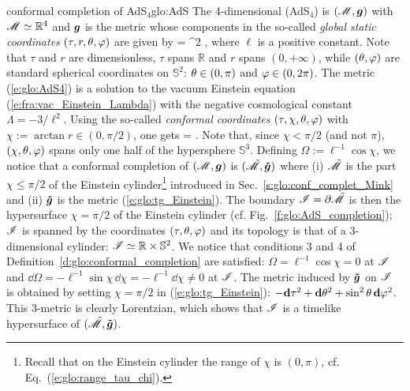 \begin{texample}{conformal completion of AdS$_{4}$}{glo:AdS}
The 4-dimensional  (AdS$_{4}$)
is $(\mathscr{M},\bm{g})$ with $\mathscr{M}\simeq \mathbb{R}^4$ and $\bm{g}$ is the metric
whose components in the so-called \emph{global static coordinates}
$(\tau,r,\theta,\varphi)$ are given by
\be \label{e:glo:AdS4}
     = \ell^2  ,
\ee
where $\ell$ is a positive constant.
Note that $\tau$ and $r$ are dimensionless, $\tau$ spans $\mathbb{R}$ and $r$ spans $(0,+\infty)$,
while $(\theta,\varphi)$ are standard spherical coordinates on $\mathbb{S}^2$:
$\theta\in(0,\pi)$ and $\varphi\in(0,2\pi)$.
The metric (\ref{e:glo:AdS4}) is a solution to
the vacuum Einstein equation (\ref{e:fra:vac_Einstein_Lambda}) with
the negative cosmological constant $\Lambda = - 3/\ell^2$.
Using the so-called \emph{conformal coordinates} $(\tau,\chi,\theta,\varphi)$ with
$\chi := \arctan r \in (0,\pi/2)$, one gets
\be \label{e:glo:metrix_AdS_conformal}
    =   .
\ee
Note that, since $\chi < \pi/2$ (and not $\pi$), $(\chi,\theta,\varphi)$ spans only one half of the hypersphere $\mathbb{S}^3$.
Defining $\Omega := \ell^{-1}\cos\chi$, we notice that
a conformal completion of $(\mathscr{M},\bm{g})$ is $(\tilde{\mathscr{M}},\bm{\tilde{g}})$
where (i) $\tilde{\mathscr{M}}$ is the part $\chi \leq \pi/2$ of the Einstein cylinder\footnote{Recall that on the
Einstein cylinder the range of $\chi$ is $(0,\pi)$, cf. Eq.~(\ref{e:glo:range_tau_chi}).}
introduced in Sec.~\ref{s:glo:conf_complet_Mink}
and (ii)  $\bm{\tilde{g}}$ is the metric (\ref{e:glo:tg_Einstein}).
The boundary $\mathscr{I} = \partial\tilde{\mathscr{M}}$ is then the hypersurface $\chi=\pi/2$
of the Einstein cylinder (cf. Fig.~\ref{f:glo:AdS_completion});
$\mathscr{I}$ is spanned by the coordinates $(\tau,\theta,\varphi)$
and its topology is that of a 3-dimensional cylinder: $\mathscr{I} \simeq \mathbb{R}\times\mathbb{S}^2$.
We notice that conditions 3 and 4 of Definition~\ref{d:glo:conformal_completion}
are satisfied: $\Omega = \ell^{-1} \cos\chi = 0$ at $\mathscr{I}$ and
$\dd\Omega = - \ell^{-1} \sin\chi\, \dd\chi = -\ell^{-1} \dd\chi \not = 0 $
at $\mathscr{I}$.
The metric induced by $\bm{\tilde{g}}$ on $\mathscr{I}$ is obtained by
setting $\chi=\pi/2$ in (\ref{e:glo:tg_Einstein}):
$- \mathbf{d} \tau^2 + \mathbf{d}\theta^2 + \sin^2\theta \, \mathbf{d}\varphi^2$.
This 3-metric is clearly Lorentzian, which shows that $\mathscr{I}$ is a timelike
hypersurface of $(\tilde{\mathscr{M}},\bm{\tilde{g}})$.
\end{texample}

